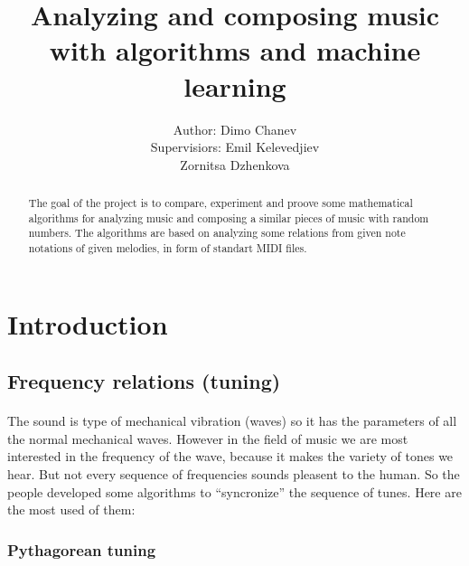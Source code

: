\documentclass[]{article}
\title{Analyzing and composing music with algorithms and machine learning}
\author{
    \begin{tabular}{rl}
        \normalsize{Author: } & \normalsize{Dimo Chanev} \\
        \scriptsize{Supervisiors: } & \scriptsize{Emil Kelevedjiev}\\
                                    & \scriptsize{Zornitsa Dzhenkova}
    \end{tabular}
}
\begin{document}
    \maketitle
    \newpage

    \tableofcontents

    \newpage
    \begin{abstract}
        The goal of the project is to compare, experiment and proove some mathematical algorithms for analyzing music and composing a similar pieces of music with random numbers. The algorithms are based on analyzing some relations from given note notations of given melodies, in form of standart MIDI files.
    \end{abstract}

    \newpage

    \section{Introduction}
        \subsection {Frequency relations (tuning)}
        \paragraph{} The sound is type of mechanical vibration (waves) so it has the parameters of all the normal mechanical waves. However in the field of music we are most interested in the frequency of the wave, because it makes the variety of tones we hear. But not every sequence of frequencies sounds pleasent to the human. So the people developed some algorithms to ``syncronize'' the sequence of tunes. Here are the most used of them:

            \subsubsection {Pythagorean tuning} 
\end{document}
